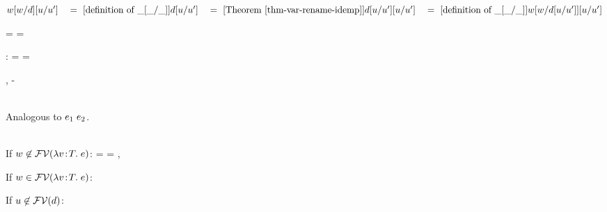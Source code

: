 \begin{bycase}

\Case{$\varII$}
\begin{links}
$\esbsren{\esbs{\varII}{\varII}{\exprI}}
 \link{=}{\defof{\esbsY}}
 \esbsren{\exprI}
 \link{=}{\thmref{thm-var-rename-idemp}}
 \esbsren{\esbsren{\exprI}}
 \link{=}{\defof{\esbsY}}
 \esbsren{\esbs{\varII}{\varII}{\esbsren{\exprI}}}$
\end{links}

\Case{$\var\neq\varII$}
\StepO
{\esbsren{\esbs{\var}{\varII}{\exprI}}
 =
 \esbsren{\var}
 =
 \esbsren{\esbs{\var}{\varII}{\esbsren{\exprI}}}}
{}

\Case{$\opO$, $\descopO$, $\pjop{\fnam}$}:
\StepO
{\esbsren{\esbs{\expr}{\varII}{\exprI}}
 =
 \expr
 =
 \esbsren{\esbs{\expr}{\varII}{\esbsren{\exprI}}}}
{}

\Case{$\appO$}
\begin{derivation}
     {, \hyp}
\steP
{\esbsren{\esbs{(\appO)}{\varII}{\exprI}}
     {}
     {}
 \esbsren{\esbs{(\appO)}{\varII}{\esbsren{\exprI}}}}
\end{derivation}

\Case{$\eqO$, $\iifO$}\\
Analogous to $\appO$.

\Case{$\absO$}\\
If $w\not\in\mathcal{FV}(\lambda v\!:\!T.\;e)$:
\StepOL
{\esbsren{\esbs{(\absO)}{\varII}{\exprI}}
 =
 \esbsren{(\absO)}
 =
 \esbsren{\esbs{(\absO)}{\varII}{\esbsren{\exprI}}}}
{, }

If $w\in\mathcal{FV}(\lambda v\!:\!T.\;e)$:
\begin{derivation}
\end{derivation}

If $u\not\in\mathcal{FV}(d)$:
\begin{derivatioN}{2}
\steP
{\esbsren{\esbs{(\absO)}{\varII}{\exprI}}
 \esbsren{(\abs{\var}{\typ}{\esbs{\expr}{\varII}{\exprI}})}
 \esbsren{(\abs{\var}{\typ}{\esbs{\expr}{\varII}{\esbsren{\exprI}}})}
 \esbsren{\esbs{(\absO)}{\varII}{\esbsren{\exprI}}}}
\end{derivatioN}


\end{bycase}
